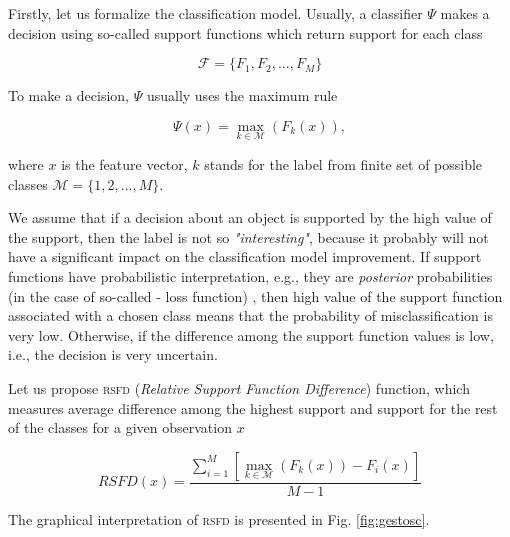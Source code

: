 \noindent Firstly, let us formalize the classification model. Usually, a classifier $\Psi$ makes a decision using so-called support functions which return support for each class \cite{Duda:2001}

\begin{equation}
\mathcal{F}=\{F_1, F_2, ..., F_M\}
\end{equation}

\noindent To make a decision, $\Psi$ usually uses the maximum rule

\begin{equation}
\Psi(x)=\mathop{\max}\limits_{k \in \mathcal{M}}\left(F_k(x)\right),
\end{equation}

\noindent where $x$ is the feature vector, $k$ stands for the label from finite set of possible classes $\mathcal{M}=\{1, 2,..., M\}$. 

We assume that if a decision about an object is supported by the high value of the support, then the label is not so \emph{"interesting"}, because it probably will not have a significant impact on the classification model improvement. If support functions have probabilistic interpretation, e.g., they are \emph{posterior} probabilities (in the case of so-called - loss function) \cite{Duda:2001}, then high value of the support function associated with a chosen class means that the probability of misclassification is very low. Otherwise, if the difference among the support function values is low, i.e., the decision is very uncertain. 

Let us propose \textsc{rsfd} (\emph{Relative Support Function Difference}) function, which measures average difference among the highest support and support for the rest of the classes for a given observation $x$   

\begin{equation}
\label{eq:rfsd}
RSFD(x)=\frac{\mathop{\sum}\limits_{i=1}^M\left[\mathop{\max}\limits_{k \in \mathcal{M}}(F_k(x))-F_i(x)\right]}{M-1}
\end{equation}

\noindent The graphical interpretation of \textsc{rsfd} is presented in Fig. \ref{fig:gestosc}.


